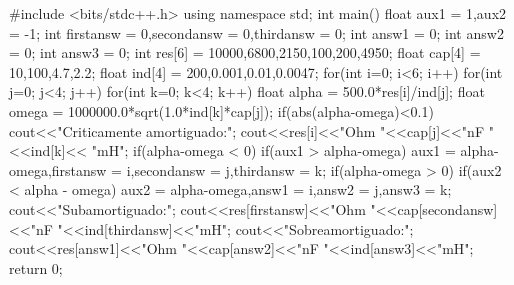 \documentclass[a4paper,12pt]{report}
\begin{document}

\begin{pyglist}[language=c++,caption={C++},listingname={\textbf{Circuito transitorio}},style=perldoc]
#include <bits/stdc++.h> 
using namespace std; 
int main(){ 
float aux1 = 1,aux2 = -1;
int firstansw = 0,secondansw = 0,thirdansw = 0;
int answ1 = 0;
int answ2 = 0;
int answ3 = 0;
int res[6] = {10000,6800,2150,100,200,4950};
float cap[4] = {10,100,4.7,2.2};
float ind[4] = {200,0.001,0.01,0.0047};
for(int i=0; i<6; i++){
  for(int j=0; j<4; j++){
    for(int k=0; k<4; k++){
      float alpha = 500.0*res[i]/ind[j];
      float omega = 1000000.0*sqrt(1.0*ind[k]*cap[j]);
      if(abs(alpha-omega)<0.1){
        cout<<"Criticamente amortiguado:\n";        
        cout<<res[i]<<"Ohm "<<cap[j]<<"nF "<<ind[k]<< "mH\n";
      }
      if(alpha-omega < 0){
        if(aux1 > alpha-omega){
          aux1 = alpha-omega,firstansw = i,secondansw = j,thirdansw = k;         	
        }
      }
      if(alpha-omega > 0){
        if(aux2 < alpha - omega){
          aux2 = alpha-omega,answ1 = i,answ2 = j,answ3 = k;
        }
      }
    }		
  }	
}
cout<<"Subamortiguado:\n";
cout<<res[firstansw]<<"Ohm "<<cap[secondansw]<<"nF "<<ind[thirdansw]<<"mH\n";
cout<<"Sobreamortiguado:\n";
cout<<res[answ1]<<"Ohm "<<cap[answ2]<<"nF "<<ind[answ3]<<"mH\n";
return 0; 
}
\end{pyglist}
\newpage
\end{document}
